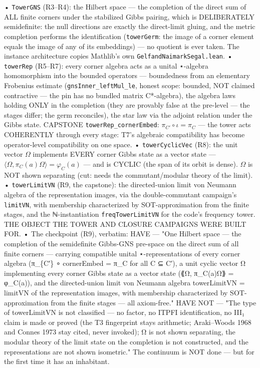 \documentclass[11pt,a4paper]{article}
\begin{document}
  • \texttt{TowerGNS} (R3--R4): the Hilbert space — the completion of the direct sum of ALL finite corners under the stabilized Gibbs pairing, which is DELIBERATELY semidefinite: the null directions are exactly the direct-limit gluing, and the metric completion performs the identification (\texttt{towerGerm}: the image of a corner element equals the image of any of its embeddings) — no quotient is ever taken. The instance architecture copies Mathlib's own \texttt{GelfandNaimarkSegal.lean}.
  • \texttt{towerRep} (R5--R7): every corner algebra acts as a unital ⋆-algebra homomorphism into the bounded operators — boundedness from an elementary Frobenius estimate (\texttt{gnsInner\_leftMul\_le}, honest scope: bounded, NOT claimed contractive — the pin has no bundled matrix C*-algebra), the algebra laws holding ONLY in the completion (they are provably false at the pre-level — the stages differ; the germ reconciles), the star law via the adjoint relation under the Gibbs state. CAPSTONE \texttt{towerRep\_cornerEmbed}: $\pi_{C'} \circ \iota = \pi_C$ — the tower acts COHERENTLY through every stage: T7's algebraic compatibility has become operator-level compatibility on one space.
  • \texttt{towerCyclicVec} (R8): the unit vector $\Omega$ implements EVERY corner Gibbs state as a vector state — $\langle\Omega, \pi_C(a)\Omega\rangle = \varphi_C(a)$ — and is CYCLIC (the span of its orbit is dense). $\Omega$ is NOT shown separating (cut: needs the commutant/modular theory of the limit).
  • \texttt{towerLimitVN} (R9, the capstone): the directed-union limit von Neumann algebra of the representation images, via the double-commutant campaign's \texttt{limitVN}, with membership characterized by SOT-approximation from the finite stages, and the ℕ-instantiation \texttt{freqTowerLimitVN} for the code's frequency tower. THE OBJECT THE TOWER AND CLOSURE CAMPAIGNS WERE BUILT FOR.
  • The checkpoint (R9), verbatim: HAVE — "One Hilbert space — the completion of the semidefinite Gibbs-GNS pre-space on the direct sum of all finite corners — carrying compatible unital ⋆-representations of every corner algebra (π\_\{C′\} ∘ cornerEmbed = π\_C for all C ⊆ C′), a unit cyclic vector Ω implementing every corner Gibbs state as a vector state (⟪Ω, π\_C(a)Ω⟫ = φ\_C(a)), and the directed-union limit von Neumann algebra towerLimitVN = limitVN of the representation images, with membership characterized by SOT-approximation from the finite stages — all axiom-free." HAVE NOT — "The type of towerLimitVN is not classified — no factor, no ITPFI identification, no III₁ claim is made or proved (the T3 fingerprint stays arithmetic; Araki–Woods 1968 and Connes 1973 stay cited, never invoked); Ω is not shown separating, the modular theory of the limit state on the completion is not constructed, and the representations are not shown isometric." The continuum is NOT done — but for the first time it has an inhabitant.
\end{document}
